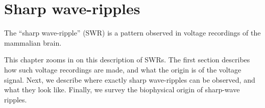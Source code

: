 
\chapter{Sharp wave-ripples}
\label{ch:SWR}


The ``sharp wave-ripple'' (SWR) is a pattern observed in voltage recordings of the mammalian brain.

This chapter zooms in on this description of SWRs. The first section describes how such voltage recordings are made, and what the origin is of the voltage signal. Next, we describe where exactly sharp wave-ripples can be observed, and what they look like. Finally, we survey the biophysical origin of sharp-wave ripples.



